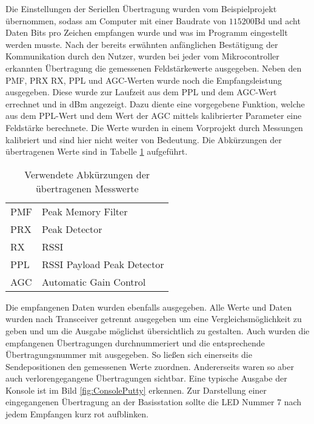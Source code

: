 Die Einstellungen der Seriellen Übertragung wurden vom Beispielprojekt übernommen, sodass am Computer mit einer Baudrate von $115200$Bd und acht Daten Bits pro Zeichen empfangen wurde und was im Programm eingestellt werden musste. Nach der bereits erwähnten anfänglichen Bestätigung der Kommunikation durch den Nutzer, wurden bei jeder vom Mikrocontroller erkannten Übertragung die gemessenen Feldstärkewerte ausgegeben. Neben den PMF, PRX RX, PPL und AGC-Werten wurde noch die Empfangsleistung ausgegeben. Diese wurde zur Laufzeit aus dem PPL und dem AGC-Wert errechnet und in dBm angezeigt. Dazu diente eine vorgegebene Funktion, welche aus dem PPL-Wert und dem Wert der \ac{AGC} mittels kalibrierter Parameter eine Feldstärke berechnete. Die Werte wurden in einem Vorprojekt durch Messungen kalibriert und sind hier nicht weiter von Bedeutung. Die Abkürzungen der übertragenen Werte sind in Tabelle \ref{tab:RSSI} aufgeführt.
\begin{table}[tbh]
	\centering
	\begin{tabular}{ll}
		
		PMF			&Peak Memory Filter\\
		PRX			&Peak Detector\\
		RX			&\acf{RSSI}\\
		PPL			&RSSI Payload Peak Detector\\
		AGC			&Automatic Gain Control\\
		
	\end{tabular}
	\caption{Verwendete Abkürzungen der übertragenen Messwerte}
	\label{tab:RSSI}
\end{table}
Die empfangenen Daten wurden ebenfalls ausgegeben. 
Alle Werte und Daten wurden nach Transceiver getrennt ausgegeben um eine Vergleichsmöglichkeit zu geben und um die Ausgabe möglichst übersichtlich zu gestalten.
Auch wurden die empfangenen Übertragungen durchnummeriert und die entsprechende Übertragungsnummer mit ausgegeben. So ließen sich einerseits die Sendepositionen den gemessenen Werte zuordnen. Andererseits waren so aber auch  verlorengegangene  Übertragungen sichtbar. Eine typische Ausgabe der Konsole ist im Bild \ref{fig:ConsolePutty} erkennen. Zur Darstellung einer eingegangenen Übertragung an der Basisstation sollte die LED Nummer 7 nach jedem Empfangen kurz rot aufblinken. %



